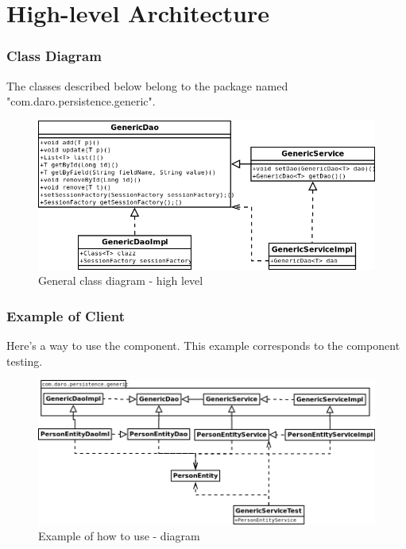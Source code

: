 \documentclass[a4paper,11pt]{book}
\begin{document}
\section{High-level Architecture}

\pagebreak
\subsubsection{Class Diagram}
The classes described below belong to the package named "com.daro.persistence.generic".

\begin{figure}[h] %
  \includegraphics[width=\textwidth]{generic_persistence_class_diagram}
  \caption{General class diagram - high level}
  \centering
  \label{fig:generic_persistence_class_diagram} %
\end{figure}

\pagebreak
\subsubsection{Example of Client}
Here's a way to use the component. This example corresponds to the component testing.

\begin{figure}[h] %
  \includegraphics[width=\textwidth]{generic_persistence_class_diagram_to_use}
  \caption{Example of how to use - diagram}
  \centering
  \label{fig:generic_persistence_class_diagram_to_use} %
\end{figure}
\end{document}
